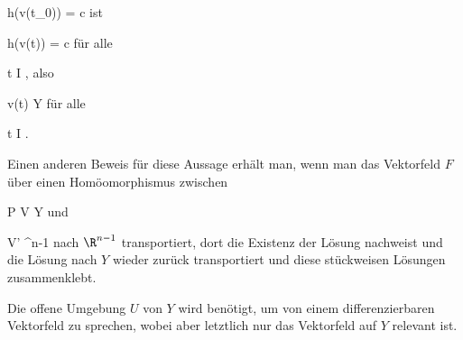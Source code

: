 {\mavergleichskette
{\vergleichskette
{ h(v(t_0))
}
{ = }{ c
}
{  }{
}
{    }{
}
{   }{
}
}
{}{}{}
ist

\mavergleichskette
{\vergleichskette
{ h(v(t))
}
{ = }{ c
}
{  }{
}
{    }{
}
{   }{
}
}
{}{}{}
für alle

\mavergleichskette
{\vergleichskette
{ t
}
{ \in }{ I
}
{  }{
}
{    }{
}
{   }{
}
}
{}{}{,}
also

\mavergleichskette
{\vergleichskette
{ v(t)
}
{ \in }{ Y
}
{  }{
}
{    }{
}
{   }{
}
}
{}{}{}
für alle

\mavergleichskette
{\vergleichskette
{ t
}
{ \in }{ I
}
{  }{
}
{    }{
}
{   }{
}
}
{}{}{.}

}

Einen anderen Beweis für diese Aussage erhält man, wenn man das Vektorfeld $F$ über einen Homöomorphismus zwischen

\mavergleichskette
{\vergleichskette
{ P
}
{ \in }{ V
}
{ \subseteq }{ Y
}
{    }{
}
{   }{
}
}
{}{}{}
und

\mavergleichskette
{\vergleichskette
{ V'
}
{ \subseteq }{ \R^{n-1}
}
{  }{
}
{    }{
}
{   }{
}
}
{}{}{}
nach $\R^{n-1}$ transportiert, dort die Existenz der Lösung nachweist und die Lösung nach $Y$  wieder zurück transportiert und diese stückweisen Lösungen zusammenklebt.

Die offene Umgebung $U$ von $Y$ wird benötigt, um von einem differenzierbaren Vektorfeld zu sprechen, wobei aber letztlich nur das Vektorfeld auf $Y$ relevant ist.


